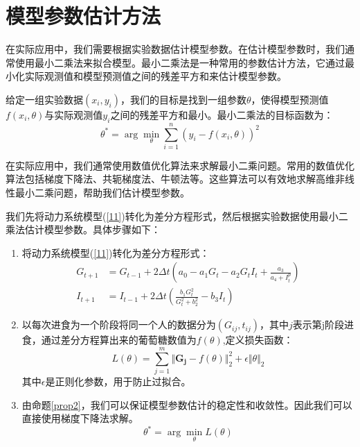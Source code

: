 \section{模型参数估计方法}
在实际应用中，我们需要根据实验数据估计模型参数。在估计模型参数时，我们通常使用最小二乘法来拟合模型。最小二乘法是一种常用的参数估计方法，它通过最小化实际观测值和模型预测值之间的残差平方和来估计模型参数。

\begin{defn}[最小二乘法]
    给定一组实验数据$(x_i, y_i)$，我们的目标是找到一组参数$\theta$，使得模型预测值$f(x_i, \theta)$与实际观测值$y_i$之间的残差平方和最小。最小二乘法的目标函数为：
    \begin{equation}
        \theta^* = \arg\min_{\theta} \sum_{i=1}^{n} (y_i - f(x_i, \theta))^2
    \end{equation}
\end{defn}

在实际应用中，我们通常使用数值优化算法来求解最小二乘问题。常用的数值优化算法包括梯度下降法、共轭梯度法、牛顿法等。这些算法可以有效地求解高维非线性最小二乘问题，帮助我们估计模型参数。

我们先将动力系统模型(\ref{11})转化为差分方程形式，然后根据实验数据使用最小二乘法估计模型参数。具体步骤如下：

\begin{enumerate}
    \item 将动力系统模型(\ref{11})转化为差分方程形式：
    \begin{equation}
        \begin{aligned}
            G_{t+1} &= G_{t-1} + 2\Delta t \left(a_0-a_1G_t-a_2G_tI_t+\frac{a_3}{a_4+I_t^p}\right) \\
            I_{t+1} &= I_{t-1} + 2\Delta t \left(\frac{b_1 G_t^2}{G_t^2 + b_2^2} - b_3 I_t\right)
        \end{aligned}
    \end{equation}
    \item 以每次进食为一个阶段将同一个人的数据分为$(G_{ij}, t_{ij})$，其中$j$表示第j阶段进食，通过差分方程算出来的葡萄糖数值为$f(\theta)$,定义损失函数：
    \begin{equation}
        L(\theta) = \sum_{j=1}^{m} \Vert \mathbf{G_j}-f(\theta) \Vert_2^2+\epsilon\Vert \theta \Vert_2
    \end{equation}
    其中$\epsilon$是正则化参数，用于防止过拟合。
    \item 由命题\ref{prop2}，我们可以保证模型参数估计的稳定性和收敛性。因此我们可以直接使用梯度下降法求解。
    \begin{equation}
        \theta^* = \arg\min_{\theta} L(\theta)
    \end{equation}
\end{enumerate}